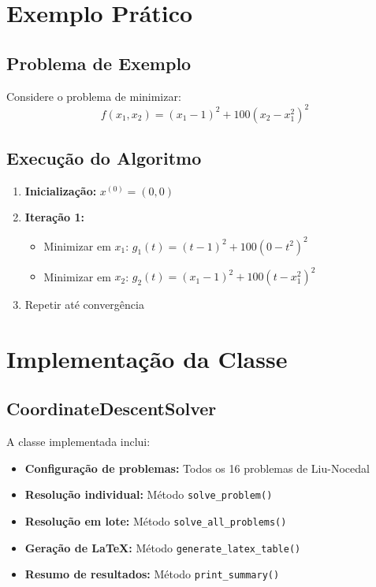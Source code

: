 \documentclass[12pt]{article}
\begin{document}
\section{Exemplo Prático}

\subsection{Problema de Exemplo}

Considere o problema de minimizar:
\begin{equation}
f(x_1, x_2) = (x_1 - 1)^2 + 100(x_2 - x_1^2)^2
\end{equation}

\subsection{Execução do Algoritmo}

\begin{enumerate}
    \item \textbf{Inicialização:} $x^{(0)} = (0, 0)$
    \item \textbf{Iteração 1:}
    \begin{itemize}
        \item Minimizar em $x_1$: $g_1(t) = (t-1)^2 + 100(0-t^2)^2$
        \item Minimizar em $x_2$: $g_2(t) = (x_1-1)^2 + 100(t-x_1^2)^2$
    \end{itemize}
    \item Repetir até convergência
\end{enumerate}

\section{Implementação da Classe}

\subsection{CoordinateDescentSolver}

A classe implementada inclui:

\begin{itemize}
    \item \textbf{Configuração de problemas:} Todos os 16 problemas de Liu-Nocedal
    \item \textbf{Resolução individual:} Método \texttt{solve\_problem()}
    \item \textbf{Resolução em lote:} Método \texttt{solve\_all\_problems()}
    \item \textbf{Geração de LaTeX:} Método \texttt{generate\_latex\_table()}
    \item \textbf{Resumo de resultados:} Método \texttt{print\_summary()}
\end{itemize}
\end{document}
